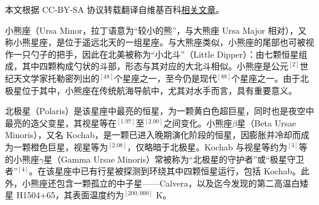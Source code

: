 
本文根据 CC-BY-SA 协议转载翻译自维基百科\href{https://en.wikipedia.org/wiki/Ursa_Minor}{相关文章}。

小熊座（Ursa Minor，拉丁语意为“较小的熊”，与大熊座 Ursa Major 相对），又称小熊星座，是位于遥远北天的一组星座。与大熊座类似，小熊座的尾部也可被视作一只勺子的把手，因此在北美被称为“小北斗”（Little Dipper）：由七颗恒星组成，其中四颗构成勺状的斗部，形态与其对应的大北斗相似。小熊座是公元$^{[2]}$世纪天文学家托勒密列出的$^{[48]}$个星座之一，至今仍是现代$^{[88]}$个星座之一。由于北极星位于其中，小熊座在传统航海导航中，尤其对水手而言，具有重要意义。

北极星（Polaris）是该星座中最亮的恒星，为一颗黄白色超巨星，同时也是夜空中最亮的造父变星，其视星等在$^{[1.97]}$至$^{[2.00]}$之间变化。小熊座$\beta$星（Beta Ursae Minoris），又名 Kochab，是一颗已进入晚期演化阶段的恒星，因膨胀并冷却而成为一颗橙色巨星，视星等为$^{[2.08]}$，仅略暗于北极星。Kochab 与视星等约为$^{[3]}$等的小熊座$\gamma$星（Gamma Ursae Minoris）常被称为“北极星的守护者”或“极星守卫者”$^{[4]}$。在该星座中已有行星被探测到环绕其中四颗恒星运行，包括 Kochab。此外，小熊座还包含一颗孤立的中子星——Calvera，以及迄今发现的第二高温白矮星 H1504+65，其表面温度约为$^{[200{,}000]}$ K。
